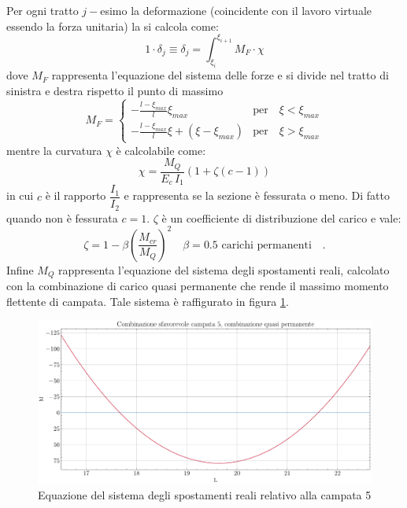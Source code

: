 Per ogni tratto $j-$esimo la deformazione (coincidente con il lavoro virtuale essendo la forza unitaria) la si calcola come:
\begin{equation}
    1\cdot \delta_j \equiv \delta_j = \int_{\xi_i}^{\xi_{i+1}} M_F \cdot \chi
\end{equation}
dove $M_F$ rappresenta l'equazione del sistema delle forze e si divide nel tratto di sinistra e destra rispetto il punto di massimo
\begin{equation}
    M_F = 
    \begin{cases}
        - \frac{l-\xi_{max}}{l}\xi_{max}  &\text{per} \quad \xi<\xi_{max}\\
        - \frac{l-\xi_{max}}{l}\xi + (\xi-\xi_{max})  &\text{per} \quad \xi>\xi_{max}
    \end{cases}
\end{equation} 
mentre la curvatura $\chi$ è calcolabile come:
\begin{equation}
    \chi =  \frac{M_Q}{E_c \, I_1} \left( 1 + \zeta (c -1) \right)
\end{equation}
in cui $c$ è il rapporto $\dfrac{I_1}{I_2}$ e rappresenta se la sezione è fessurata o meno. Di fatto quando non è fessurata $c = 1$. $\zeta$ è un coefficiente di distribuzione del carico e vale:
\[
    \zeta = 1 - \beta \left(\frac{M_{cr}}{M_Q}\right)^2   \quad \text{$\beta = 0.5$ carichi permanenti} \quad .
\]
Infine $M_Q$ rappresenta l'equazione del sistema degli spostamenti reali, calcolato con la combinazione di carico quasi permanente che rende il massimo momento flettente di campata.
Tale sistema è raffigurato in figura \ref{fig:sle_deformazione_MQ}.
\begin{figure}[htb]
    \centering
    \includegraphics[height=0.25\textheight]{IMG/SLS_QP_M_deflectionC5.pdf}
    \caption{Equazione del sistema degli spostamenti reali relativo alla campata 5}
    \label{fig:sle_deformazione_MQ}
  \end{figure}

